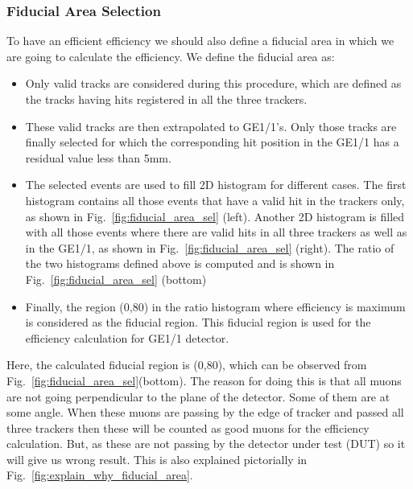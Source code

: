\subsubsection{Fiducial Area Selection} %
\label{ssub:fiducial_area_selection}
To have an efficient efficiency we should also define a fiducial area in which we are going to calculate the efficiency. We define the fiducial area as:
\begin{itemize}
        \item Only valid tracks are considered during this procedure, which are defined as the tracks having hits registered in all the three trackers.
        \item These valid tracks are then extrapolated to GE1/1’s. Only those tracks are finally selected for which the corresponding hit position in the GE1/1 has a residual value less than 5mm.
        \item The selected events are used to fill 2D histogram for different cases. The first histogram contains all those events that have a valid hit in the trackers only, as shown in Fig.~\ref{fig:fiducial_area_sel} (left). Another 2D histogram is filled with all those events where there are valid hits in all three trackers as well as in the GE1/1, as shown in Fig.~\ref{fig:fiducial_area_sel} (right). The ratio of the two histograms defined above is computed and is shown in Fig.~\ref{fig:fiducial_area_sel} (bottom)
        \item Finally, the region (0,80) in the ratio histogram where efficiency is maximum is considered as the fiducial region. This fiducial region is used for the efficiency calculation for GE1/1 detector.
\end{itemize}
Here, the calculated fiducial region is (0,80), which can be observed from Fig.~\ref{fig:fiducial_area_sel}(bottom). The reason for doing this is that all muons are not going perpendicular to the plane of the detector. Some of them are at some angle. When these muons are passing by the edge of tracker and passed all three trackers then these will be counted as good muons for the efficiency calculation. But, as these are not passing by the detector under test (DUT) so it will give us wrong result. This is also explained pictorially in Fig.~\ref{fig:explain_why_fiducial_area}.
